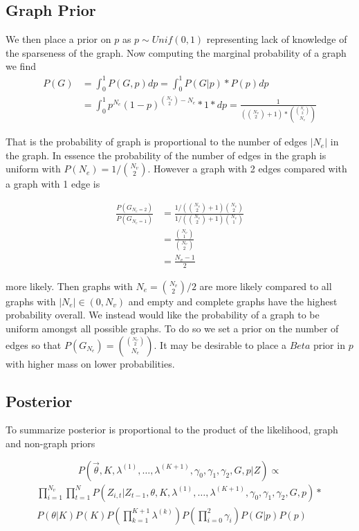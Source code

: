 \documentclass[11pt,a4paper]{article}
\numberwithin{equation}{section}
\begin{document}
\hypertarget{graph-prior}{%
\subsection{Graph Prior}\label{graph-prior}}

We then place a prior on \(p\) as \(p \sim Unif(0,1)\) representing lack
of knowledge of the sparseness of the graph. Now computing the marginal
probability of a graph we find
\[ \begin{aligned} P(G)  & = \int_0^1  P(G,p)dp   = \int_0^1 P(G|p)*P(p)dp \\ 
&= \int_0^1 p^{N_e}(1-p)^{\binom{N_v}{2}-N_e}*1*dp = \frac{1}{(\binom{N_v}{2}+1)* \binom{\binom{N_v}{2}}{N_e} }  \end{aligned}\]

That is the probability of graph is proportional to the number of edges
\(|N_e|\) in the graph. In essence the probability of the number of
edges in the graph is uniform with \(P(N_e) = 1/\binom{N_v}{2}\).
However a graph with 2 edges compared with a graph with 1 edge is

\[\begin{aligned}\frac{ P(G_{N_e = 2})}{P(G_{N_e = 1})}  &=  \frac{1/(\binom{N_v}{2}+1)\binom{N_v}{2}}{1/(\binom{N_v}{2}+1)\binom{N_v}{1}} \\& = \frac{\binom{N_v}{1}}{\binom{N_v}{2}}  \\& = \frac{N_v-1}{2} \end{aligned}\]

more likely. Then graphs with \(N_e = \binom{N_v}{2}/2\) are more likely
compared to all graphs with \(|N_e| \in (0, N_v)\) and empty and
complete graphs have the highest probability overall. We instead would
like the probability of a graph to be uniform amongst all possible
graphs. To do so we set a prior on the number of edges so that
\(P(G_{N_e}) = \binom{\binom{N_v}{2}}{N_e}\). It may be desirable to
place a \(Beta\) prior in \(p\) with higher mass on lower probabilities.

\hypertarget{posterior}{%
\subsection{Posterior}\label{posterior}}

To summarize posterior is proportional to the product of the likelihood,
graph and non-graph priors

\[ P(\vec{\theta}, K, \lambda^{(1)}, \dots, \lambda^{(K+1)}, \gamma_0, \gamma_1, \gamma_2, G,p|Z)  \propto \]
\[\begin{aligned}\prod_{i=1}^{N_v}\prod_{t=1}^N P(Z_{i,t}|Z_{t-1},\theta, K, \lambda^{(1)}, \dots, \lambda^{(K+1)}, \gamma_0, \gamma_1, \gamma_2,G,p)*\\P(\theta|K)P(K)P(\prod_{k=1}^{K+1}\lambda^{(k)} )P(\prod_{i=0}^2 \gamma_i)P(G|p)P(p) \end{aligned} \]
\end{document}
